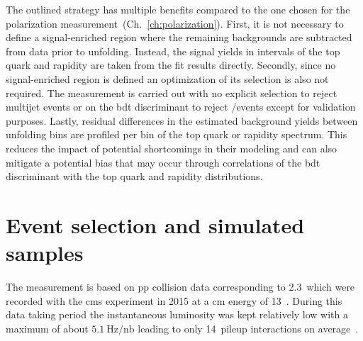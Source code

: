 The outlined strategy has multiple benefits compared to the one chosen for the polarization measurement~(Ch.~\ref{ch:polarization}). First, it is not necessary to define a signal-enriched region where the remaining backgrounds are subtracted from data prior to unfolding. Instead, the signal yields in intervals of the top quark \pt and rapidity are taken from the fit results directly. Secondly, since no signal-enriched region is defined an optimization of its selection is also not required. The measurement is carried out with no explicit selection to reject multijet events or on the \gls{bdt} discriminant to reject \wjets/\ttbar events except for validation purposes. Lastly, residual differences in the estimated background yields between unfolding bins are profiled per bin of the top quark \pt or rapidity spectrum. This reduces the impact of potential shortcomings in their modeling and can also mitigate a potential bias that may occur through correlations of the \gls{bdt} discriminant with the top quark \pt and rapidity distributions.



\section{Event selection and simulated samples}
\label{sec:diff13-selection}

The measurement is based on \gls{pp} collision data corresponding to 2.3~\invfb which were recorded with the \gls{cms} experiment in 2015 at a \acrlong{cm} energy of 13~\TeV. During this data taking period the instantaneous luminosity was kept relatively low with a maximum of about $5.1~\mathrm{Hz}/\mathrm{nb}$ leading to only 14~pileup interactions on average~\cite{lumipublic}. 

